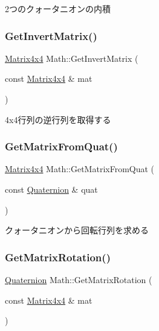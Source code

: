 2つのクォータニオンの内積 

\mbox{\label{namespace_math_a1511b5df243ca4ee521026cb9b373efd}} 
\subsubsection{\texorpdfstring{Get\+Invert\+Matrix()}{GetInvertMatrix()}}
{\footnotesize\ttfamily \mbox{\hyperlink{struct_math_1_1_matrix4x4}{Matrix4x4}} Math\+::\+Get\+Invert\+Matrix (\begin{DoxyParamCaption}\item[{const \mbox{\hyperlink{struct_math_1_1_matrix4x4}{Matrix4x4}} \&}]{mat }\end{DoxyParamCaption})}



4x4行列の逆行列を取得する 

\mbox{\label{namespace_math_aac3705a108d796688a41340d99852f2e}} 
\subsubsection{\texorpdfstring{Get\+Matrix\+From\+Quat()}{GetMatrixFromQuat()}}
{\footnotesize\ttfamily \mbox{\hyperlink{struct_math_1_1_matrix4x4}{Matrix4x4}} Math\+::\+Get\+Matrix\+From\+Quat (\begin{DoxyParamCaption}\item[{const \mbox{\hyperlink{struct_math_1_1_quaternion}{Quaternion}} \&}]{quat }\end{DoxyParamCaption})}



クォータニオンから回転行列を求める 

\mbox{\label{namespace_math_af020b3d35d199e53d32895a737e7c02e}} 
\subsubsection{\texorpdfstring{Get\+Matrix\+Rotation()}{GetMatrixRotation()}}
{\footnotesize\ttfamily \mbox{\hyperlink{struct_math_1_1_quaternion}{Quaternion}} Math\+::\+Get\+Matrix\+Rotation (\begin{DoxyParamCaption}\item[{const \mbox{\hyperlink{struct_math_1_1_matrix4x4}{Matrix4x4}} \&}]{mat }\end{DoxyParamCaption})}



